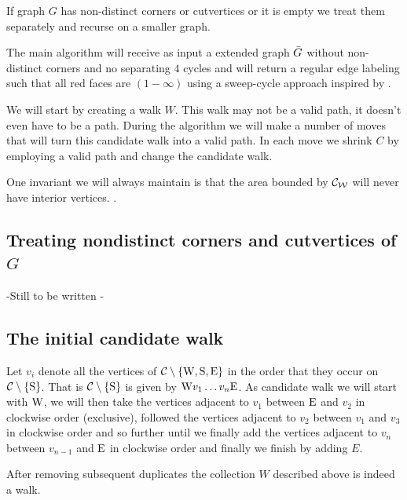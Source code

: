 If graph $G$ has non-distinct corners or cutvertices or it is empty we treat them separately and recurse on a smaller graph. 


The main algorithm will receive as input a extended graph $\bar{G}$ without non-distinct corners and no separating $4$ cycles and will return a regular edge labeling such that all red faces are $(1-\infty)$ using a sweep-cycle approach inspired by \Fusy {} \cite{Fusy2006}.

We will start by creating a walk $W$. This walk may not be a valid path, it doesn't even have to be a path. During the algorithm we will make a number of moves that will turn this candidate walk into a valid path. In each move we shrink $C$ by employing a valid path and change the candidate walk.

One invariant we will always maintain is that the area bounded by $\mathcal{C}_{\mathcal{W}}$ will never have interior vertices. .

\subsection{Treating nondistinct corners and cutvertices of $G$}
-Still to be written -

\subsection{The initial candidate walk}
Let $v_i$ denote all the vertices of $\mathcal{C} \setminus \left\lbrace {\mathrm{W}, \mathrm{S}, \mathrm{E}} \right\rbrace$ in the order that they occur on $\mathcal{C} \setminus \left\lbrace {\mathrm{S}} \right\rbrace$.  That is $\mathcal{C} \setminus \left\lbrace {\mathrm{S}} \right\rbrace$ is given by $\mathrm{W} v_1 \ldots v_n \mathrm{E}$. 
As candidate walk we will start with $\mathrm{W}$, we will then take the vertices adjacent to $v_1$ between $\mathrm{E}$ and $v_2$ in clockwise order (exclusive), followed the vertices adjacent to $v_2$ between $v_1$ and $v_3$ in clockwise order and so further until we finally add the vertices adjacent to $v_n$ between $v_{n-1}$ and $\mathrm{E}$ in clockwise order and finally we finish by adding $E$.

\begin{lemma}
After removing subsequent duplicates the collection $W$ described above is indeed a walk.
\end{lemma}


